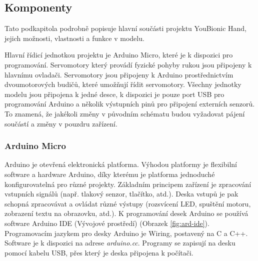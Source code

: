\documentclass[thesis=B,czech]{FITthesis}[2012/06/26]
\begin{document}
\subsection{Komponenty}
\label{subsec:Komp}

Tato podkapitola podrobně popisuje hlavní součásti projektu YouBionic Hand, jejich možnosti, vlastnosti a funkce v modelu. 

Hlavní řídicí jednotkou projektu je Arduino Micro, které je k dispozici pro programování. Servomotory který provádí fyzické pohyby rukou jsou připojeny k hlavnímu ovladači. Servomotory jsou připojeny k Arduino prostřednictvím dvoumotorových budičů, které umožňují řídit servomotory. Všechny jednotky modelu jsou připojena k jedné desce, k dispozici je pouze port USB pro programování Arduino a několik výstupních pinů pro připojení externích senzorů. To znamená, že jakékoli změny v původním schématu budou vyžadovat pájení součástí a změny v pouzdru zařízení.


\subsubsection{Arduino Micro}

Arduino je otevřená elektronická platforma. Výhodou platformy je flexibilní software a hardware Arduino, díky kterému je platforma jednoduché konfigurovatelná pro různé projekty. Základním principem zařízení je zpracování vstupních signálů (např. tlakový senzor, tlačítko, atd.).  Deska vstupů je pak schopná zpracovávat a ovládat různé výstupy (rozsvícení LED, spuštění motoru, zobrazení textu na obrazovku, atd.). K programování desek Arduino se používá software Arduino IDE (Vývojové prostředí) (Obrazek \ref{fig:ard-ide}). Programovacím jazykem pro desky Arduino je Wiring, postavený na C a C++. Software je k dispozici na adrese \textit{arduino.cc}. Programy se zapisují na desku pomocí kabelu USB, přes který je deska připojena k počítači. 
\end{document}
